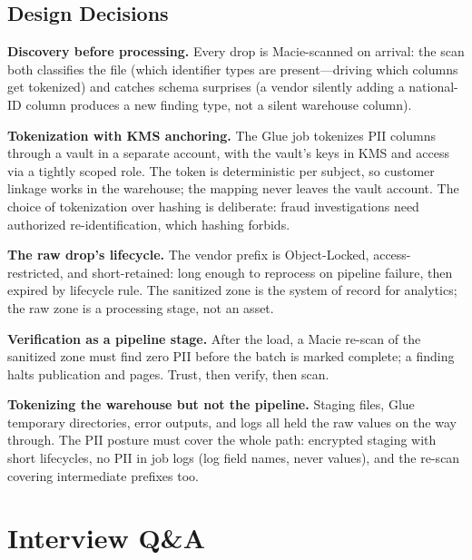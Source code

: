 \subsection{Design Decisions}
\textbf{Discovery before processing.} Every drop is Macie-scanned on arrival: the scan both classifies the file (which identifier types are present---driving which columns get tokenized) and catches schema surprises (a vendor silently adding a national-ID column produces a new finding type, not a silent warehouse column).

\textbf{Tokenization with KMS anchoring.} The Glue job tokenizes PII columns through a vault in a separate account, with the vault's keys in KMS and access via a tightly scoped role. The token is deterministic per subject, so customer linkage works in the warehouse; the mapping never leaves the vault account. The choice of tokenization over hashing is deliberate: fraud investigations need authorized re-identification, which hashing forbids.

\textbf{The raw drop's lifecycle.} The vendor prefix is Object-Locked, access-restricted, and short-retained: long enough to reprocess on pipeline failure, then expired by lifecycle rule. The sanitized zone is the system of record for analytics; the raw zone is a processing stage, not an asset.

\textbf{Verification as a pipeline stage.} After the load, a Macie re-scan of the sanitized zone must find zero PII before the batch is marked complete; a finding halts publication and pages. Trust, then verify, then scan.

\begin{pitfall}
\textbf{Tokenizing the warehouse but not the pipeline.} Staging files, Glue temporary directories, error outputs, and logs all held the raw values on the way through. The PII posture must cover the whole path: encrypted staging with short lifecycles, no PII in job logs (log field names, never values), and the re-scan covering intermediate prefixes too.
\end{pitfall}

\section{Interview Q\&A}

